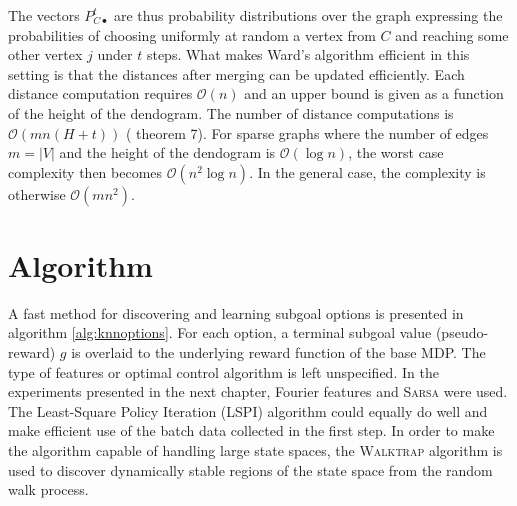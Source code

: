 The vectors $P^t_{C\bullet}$ are thus probability distributions over the graph expressing the probabilities of choosing uniformly at random a vertex from $C$ and reaching some other vertex $j$ under $t$ steps. What makes Ward's algorithm efficient in this setting is that the distances after merging can be updated efficiently. Each distance computation requires $\mathcal{O}(n)$ and an upper bound is given as a function of the height of the dendogram. The number of distance computations is $\mathcal{O}(mn(H + t))$ (\cite{Pons2005} theorem 7). For sparse graphs where the number of edges $m = |V|$ and the height of the dendogram is $\mathcal{O}(\log n)$, the worst case complexity then becomes $\mathcal{O}(n^2 \log n)$. In the general case, the complexity is otherwise $\mathcal{O}(mn^2)$. 

\section{Algorithm}

A fast method for discovering and learning subgoal options is presented in algorithm \ref{alg:knnoptions}. For each option, a terminal subgoal value (pseudo-reward) $g$ is overlaid to the underlying reward function of the base MDP. The type of features or optimal control algorithm is left unspecified. In the experiments presented in the next chapter, Fourier features and \textsc{Sarsa} were used. The Least-Square Policy Iteration (LSPI) \parencite{Lagoudakis2003} algorithm could equally do well and make efficient use of the batch data collected in the first step. In order to make the algorithm capable of handling large state spaces, the \textsc{Walktrap} algorithm is used to discover dynamically stable regions of the state space from the random walk process. 

